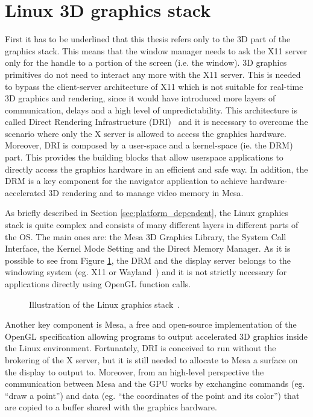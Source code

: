 \section{Linux 3D graphics stack}
First it has to be underlined that this thesis refers only to the 3D part of the
graphics stack. This means that the window manager needs to ask the X11 server
only for the handle to a portion of the screen (i.e. the window).
3D graphics primitives do not need to interact any more with the X11 server. This
is needed to bypass the client-server architecture of X11 which is not suitable for
real-time 3D graphics and rendering, since it would have introduced more layers
of communication, delays and a high level of unpredictability.
This architecture is called
Direct Rendering Infrastructure (DRI)~\cite{paul2000introduction} and it is
necessary to overcome the scenario where only the X server is allowed to access
the graphics hardware. Moreover, DRI is composed by a user-space and a kernel-space
(ie. the DRM) part. This provides the building blocks that allow userspace applications
to directly access the graphics hardware in an efficient and safe way.
In addition, the DRM is a key component for the navigator application to achieve
hardware-accelerated 3D rendering and to manage video memory in Mesa.

As briefly described in Section \ref{sec:platform_dependent}, the Linux graphics
stack is quite complex and consists of many different layers in different parts
of the OS. The main ones are: the Mesa 3D Graphics Library, the System Call
Interface, the Kernel Mode Setting and the Direct Memory Manager.
As it is possible to see from Figure \ref{img:linux_graphics_stack}, the DRM and 
the display server belongs to the windowing system (eg. X11 or Wayland~\cite{wayland}) 
and it is not strictly necessary for applications directly using OpenGL function
calls.
\begin{figure}[!htb]
    \caption{Illustration of the Linux graphics stack~\cite{fig_linux_graphics_stack}.}
    \label{img:linux_graphics_stack}
\end{figure}

Another key component is Mesa, a free and open-source implementation of the
OpenGL specification allowing
programs to output accelerated 3D graphics inside the Linux environment. Fortunately,
DRI is conceived to run without the brokering of the X server, but it is still
needed to allocate to Mesa a surface on the display to output to. Moreover, from
an high-level perspective the communication between Mesa and the GPU works by
exchanginc commands (eg. ``draw a point'') and data (eg. ``the coordinates of the
point and its color'') that are copied to a buffer shared with the graphics hardware.


